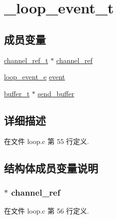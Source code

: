\hypertarget{struct__loop__event__t}{}\section{\+\_\+loop\+\_\+event\+\_\+t}
\label{struct__loop__event__t}
\subsection*{成员变量}
\begin{DoxyCompactItemize}
\item 
\hyperlink{config_8h_a151271c9d188ef28d4d24bb81dcc1263}{channel\+\_\+ref\+\_\+t} $\ast$ \hyperlink{struct__loop__event__t_ae824bc2e5f0851cf77fdfaf0804105f8}{channel\+\_\+ref}
\item 
\hyperlink{loop_8c_ab92fe4e788615cfd56530167651a8ff4}{loop\+\_\+event\+\_\+e} \hyperlink{struct__loop__event__t_a636055ba7fb0edbbec2869e8191614eb}{event}
\item 
\hyperlink{config_8h_aad99a77d28bd81d3d36d0ea569c9482d}{buffer\+\_\+t} $\ast$ \hyperlink{struct__loop__event__t_a952b3a97af878839c889043391f5bc25}{send\+\_\+buffer}
\end{DoxyCompactItemize}


\subsection{详细描述}


在文件 loop.\+c 第 55 行定义.



\subsection{结构体成员变量说明}
\hypertarget{struct__loop__event__t_ae824bc2e5f0851cf77fdfaf0804105f8}{}
\subsubsection[{channel\+\_\+ref}]{$\ast$ channel\+\_\+ref}\label{struct__loop__event__t_ae824bc2e5f0851cf77fdfaf0804105f8}


在文件 loop.\+c 第 56 行定义.

\hypertarget{struct__loop__event__t_a636055ba7fb0edbbec2869e8191614eb}{}
